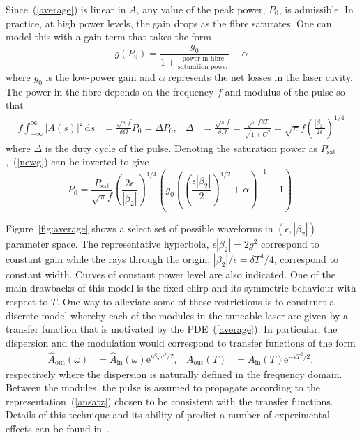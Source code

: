 \documentclass[12pt]{article}
\providecommand{\df}{\textrm{d}}
\begin{document}
Since~(\ref{average}) is linear in $A$, any value of the peak power, $P_0$, is admissible.  In practice, 
at high power levels, the gain drops as the fibre saturates.  One can model this with a gain term that
takes the form
\begin{equation}
\label{newg}
	g(P_0) = \frac{g_0}{1+\frac{\textrm{power in fibre}}{\textrm{saturation power}}} - \alpha
\end{equation}
where $g_0$ is the low-power gain and $\alpha$ represents the net losses in the laser cavity.
The power in the fibre depends on the frequency $f$ and modulus of the pulse so that
\begin{align*}
	f \int_{-\infty}^\infty |A(s)|^2\, \df s &=
	\frac{\sqrt{\pi}f}{\delta\Omega}P_0 = \Delta P_0, &
	\Delta &= \frac{\sqrt{\pi}f}{\delta\Omega} = \frac{\sqrt{\pi}f\delta T}{\sqrt{1+C^2}}=
	\sqrt{\pi}f \left(\frac{|\beta_2|}{2\epsilon}\right)^{1/4}
\end{align*}
where $\Delta$ is the duty cycle of the pulse.  Denoting the saturation power as 
$P_{\textrm{sat}}$,~(\ref{newg}) can be inverted to give
\[
	P_0 = \frac{P_{\textrm{sat}}}{\sqrt{\pi}f}  \left(\frac{2\epsilon}{|\beta_2|}\right)^{1/4}
	\left(g_0\left(\left(\frac{\epsilon|\beta_2|}{2}\right)^{1/2} + \alpha\right)^{-1} - 1\right).
\]

Figure~\ref{fig:average} shows a select set of possible waveforms in $(\epsilon,|\beta_2|)$ parameter space.  
The representative hyperbola, $\epsilon|\beta_2| = 2g^2$ correspond to constant gain while
the rays through the origin, $|\beta_2|/\epsilon = \delta T^4/4$, correspond to constant width.
Curves of constant power level are also indicated.  One of the main drawbacks of this model is 
the fixed chirp and its symmetric behaviour with respect to $T$.  One way to alleviate some of these
restrictions is to construct a discrete model whereby each of the modules in the tuneable laser
are given by a transfer function that is motivated by the PDE~(\ref{average}).  In particular, the
dispersion and the modulation would correspond to transfer functions of the form
\begin{align}
	\hat{A}_{\textrm{out}}(\omega) &= \hat{A}_{\textrm{in}}(\omega)\textrm{e}^{i\beta_2\omega^2/2},&
	A_{\textrm{out}}(T) &= A_{\textrm{in}}(T)\textrm{e}^{-\epsilon T^2/2},
\end{align}
respectively where the dispersion is naturally defined in the frequency domain.  Between the modules, 
the pulse is assumed to propagate according to the representation~(\ref{ansatz}) chosen to be consistent
with the transfer functions.  Details of this technique and its ability of predict a number of experimental
effects can be found in~\cite{burgoyne2014}.
\end{document}
